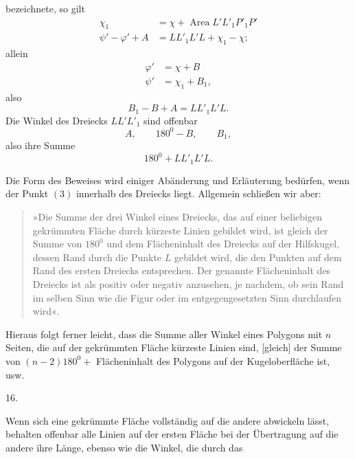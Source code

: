 %
bezeichnete, so gilt
\[
\begin{aligned}
\chi_1&=\chi+\operatorname{Area}L'L'_1P'_1P'\\
\psi'-\varphi'+A&=LL'_1L'L+\chi_1-\chi;
\end{aligned}
\]
allein
\[
\begin{aligned}
\varphi'&=\chi+B\\
\psi'&=\chi_1+B_1,
\end{aligned}
\]
also
\[
B_1-B+A=LL'_1L'L.
\]
Die Winkel des Dreiecks $LL'L'_1$ sind offenbar
\[
A,\qquad 180^{0}-B,\qquad B_1,
\]
also ihre Summe
\[
180^{0}+LL'_1L'L.
\]

Die Form des Beweises wird einiger Abänderung und Erläuterung bedürfen, wenn der Punkt $(3)$ innerhalb des Dreiecks liegt. Allgemein schließen wir aber:
\begin{quote}
»Die Summe der drei Winkel eines Dreiecks, das auf einer beliebigen gekrümmten Fläche durch kürzeste Linien gebildet wird, ist gleich der Summe von $180^{0}$ und dem Flächeninhalt des Dreiecks auf der Hilfskugel, dessen Rand durch die Punkte $L$ gebildet wird, die den Punkten auf dem Rand des ersten Dreiecks entsprechen. Der genannte Flächeninhalt des Dreiecks ist als positiv oder negativ anzusehen, je nachdem, ob sein Rand im selben Sinn wie die Figur oder im entgegengesetzten Sinn durchlaufen wird«.
\end{quote}
\noindent\hspace*{1.2em}Hieraus folgt ferner leicht, dass die Summe aller Winkel eines Polygons mit $n$ Seiten, die auf der gekrümmten Fläche kürzeste Linien sind, [gleich] der Summe von $(n-2)180^{0}+$ Flächeninhalt des Polygons auf der Kugeloberfläche ist, usw.

\begin{center}16.\end{center}
\noindent\hspace*{1.2em}Wenn sich eine gekrümmte Fläche vollständig auf die andere abwickeln lässt, behalten offenbar alle Linien auf der ersten Fläche bei der Übertragung auf die andere ihre Länge, ebenso wie die Winkel, die durch das
